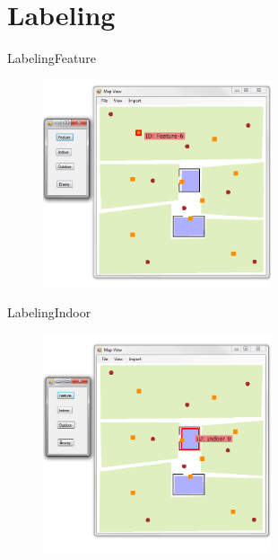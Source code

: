 \section{Labeling}

\begin{frame}{Labeling}{Feature}

\begin{figure}
\centering
\includegraphics[width = 0.6\textwidth]{./screenshot/feature_label.png}
\end{figure}

\end{frame}

\begin{frame}{Labeling}{Indoor}

\begin{figure}
\centering
\includegraphics[width = 0.6\textwidth]{./screenshot/indoor_label.png}
\end{figure}

\end{frame}

